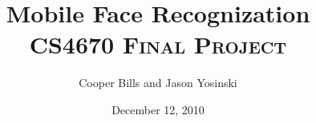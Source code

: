 \documentclass[11pt,letterpaper]{article}
\title{Mobile Face Recognization\\
\textsc{\normalsize CS4670 Final Project}}
\author{Cooper Bills and Jason Yosinski \\
\code{\{csb88,jy495\}@cornell.edu}}
\date{December 12, 2010}
\begin{document}
\maketitle

\begin{abstract}

\end{abstract}




%




\end{document}
